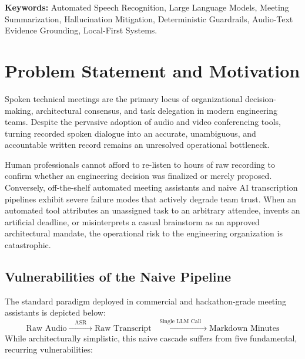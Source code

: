 \documentclass[10pt,a4paper]{article}
\begin{document}
\vspace{5pt}
\noindent\textbf{Keywords:} Automated Speech Recognition, Large Language Models, Meeting Summarization, Hallucination Mitigation, Deterministic Guardrails, Audio-Text Evidence Grounding, Local-First Systems.

\vspace{10pt}

\section{Problem Statement and Motivation}
\label{sec:problem_statement}

Spoken technical meetings are the primary locus of organizational decision-making, architectural consensus, and task delegation in modern engineering teams. Despite the pervasive adoption of audio and video conferencing tools, turning recorded spoken dialogue into an accurate, unambiguous, and accountable written record remains an unresolved operational bottleneck. 

Human professionals cannot afford to re-listen to hours of raw recording to confirm whether an engineering decision was finalized or merely proposed. Conversely, off-the-shelf automated meeting assistants and naive AI transcription pipelines exhibit severe failure modes that actively degrade team trust. When an automated tool attributes an unassigned task to an arbitrary attendee, invents an artificial deadline, or misinterprets a casual brainstorm as an approved architectural mandate, the operational risk to the engineering organization is catastrophic.

\subsection{Vulnerabilities of the Naive Pipeline}
The standard paradigm deployed in commercial and hackathon-grade meeting assistants is depicted below:
\begin{equation}
\text{Raw Audio} \xrightarrow{\quad\text{ASR}\quad} \text{Raw Transcript} \xrightarrow{\quad\text{Single LLM Call}\quad} \text{Markdown Minutes}
\end{equation}
While architecturally simplistic, this naive cascade suffers from five fundamental, recurring vulnerabilities:
\end{document}
